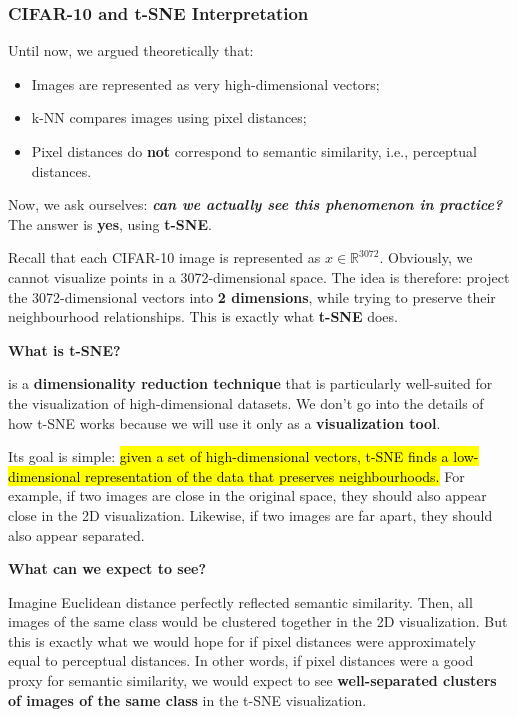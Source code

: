 \subsubsection{CIFAR-10 and t-SNE Interpretation}\label{sec:cifar-10-and-t-sne-interpretation}

Until now, we argued theoretically that:
\begin{itemize}
    \item Images are represented as very high-dimensional vectors;
    \item k-NN compares images using pixel distances;
    \item Pixel distances do \textbf{not} correspond to semantic similarity, i.e., perceptual distances.
\end{itemize}
Now, we ask ourselves: \emph{\textbf{can we actually see this phenomenon in practice?}} The answer is \textbf{yes}, using \textbf{t-SNE}.

\highspace
Recall that each CIFAR-10 image is represented as $x \in \mathbb{R}^{3072}$. Obviously, we cannot visualize points in a 3072-dimensional space. The idea is therefore: project the 3072-dimensional vectors into \textbf{2 dimensions}, while trying to preserve their neighbourhood relationships. This is exactly what \textbf{t-SNE} does.

\highspace
\begin{flushleft}
    \textcolor{Green3}{ \textbf{What is t-SNE?}}
\end{flushleft}
 is a \textbf{dimensionality reduction technique} that is particularly well-suited for the visualization of high-dimensional datasets. We don't go into the details of how t-SNE works because we will use it only as a \textbf{visualization tool}.

\highspace
Its goal is simple: \hl{given a set of high-dimensional vectors, t-SNE finds a low-dimensional representation of the data that preserves neighbourhoods.} For example, if two images are close in the original space, they should also appear close in the 2D visualization. Likewise, if two images are far apart, they should also appear separated.

\highspace
\begin{flushleft}
    \textcolor{Green3}{ \textbf{What can we expect to see?}}
\end{flushleft}
Imagine Euclidean distance perfectly reflected semantic similarity. Then, all images of the same class would be clustered together in the 2D visualization. But this is exactly what we would hope for if pixel distances were approximately equal to perceptual distances. In other words, if pixel distances were a good proxy for semantic similarity, we would expect to see \textbf{well-separated clusters of images of the same class} in the t-SNE visualization.

